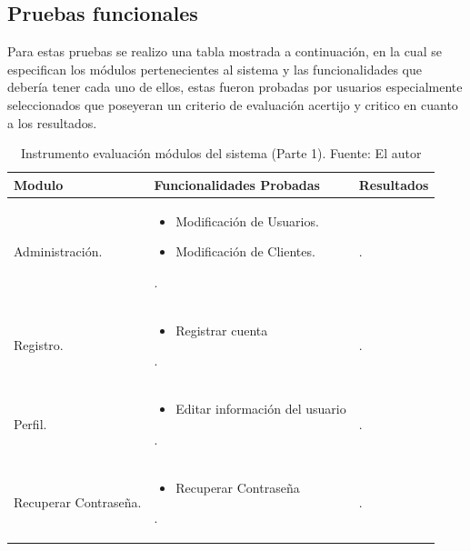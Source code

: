 \setlength{\parskip}{0mm}



\subsection{Pruebas funcionales}
\setlength{\parskip}{5mm}


Para estas pruebas se realizo una tabla mostrada a continuación, en la cual se especifican los módulos pertenecientes al sistema y las funcionalidades que debería tener cada uno de ellos, estas fueron probadas por usuarios especialmente seleccionados que poseyeran un criterio de evaluación acertijo y critico en cuanto a los resultados. 
\setlength{\parskip}{0mm}

\begin{table}[H]	
\begin{center}
\begin{tabular}{ | m{4cm} | m{8cm}| m{3cm}| } 
 \hline
 Modulo & Funcionalidades Probadas & Resultados \\
 \hline
 Administración. 
 & 
 \begin{itemize}
 	\item Modificación de Usuarios.
 	\item Modificación de Clientes.
 \end{itemize}. 
 & 
 .\\

 \hline
 Registro. 
 & 
 \begin{itemize}
 	\item Registrar cuenta
 \end{itemize}. 
 & 
 .\\

 \hline
 Perfil. 
 & 
 \begin{itemize}
 	\item Editar información del usuario
 \end{itemize}. 
 & 
 .\\

 \hline
 
 Recuperar Contraseña.
 & 
 \begin{itemize}
 	\item Recuperar Contraseña 
 \end{itemize}. 
 & 
 .\\

 \hline

 \end{tabular}
\caption{Instrumento evaluación módulos del sistema (Parte 1). Fuente: El autor}
\label{Tabla:7}
\end{center}
\end{table}	

